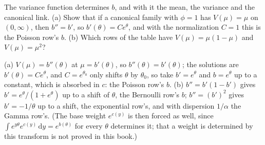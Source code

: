 \begin{exercise}
\label{ex:ef-variance-determines}
The variance function determines $b$, and with it the mean, the variance and the canonical link. (a) Show that if a canonical family with $\phi = 1$ has $V(\mu) = \mu$ on $(0, \infty)$, then $b'' = b'$, so $b'(\theta) = Ce^\theta$, and with the normalization $C = 1$ this is the Poisson row's $b$. (b) Which rows of the table have $V(\mu) = \mu(1 - \mu)$ and $V(\mu) = \mu^2$?
\end{exercise}
\begin{solution}
(a) $V(\mu) = b''(\theta)$ at $\mu = b'(\theta)$, so $b''(\theta) = b'(\theta)$; the solutions are $b'(\theta) = Ce^\theta$, and $C = e^{\theta_0}$ only shifts $\theta$ by $\theta_0$, so take $b' = e^\theta$ and $b = e^\theta$ up to a constant, which is absorbed in $c$: the Poisson row's $b$. (b) $b'' = b'(1 - b')$ gives $b' = e^\theta/(1 + e^\theta)$ up to a shift of $\theta$, the Bernoulli row's $b$; $b'' = (b')^2$ gives $b' = -1/\theta$ up to a shift, the exponential row's, and with dispersion $1/\alpha$ the Gamma row's. (The base weight $e^{c(y)}$ is then forced as well, since $\int e^{y\theta}e^{c(y)}\,\mathrm{d}y = e^{b(\theta)}$ for every $\theta$ determines it; that a weight is determined by this transform is not proved in this book.)
\end{solution}

